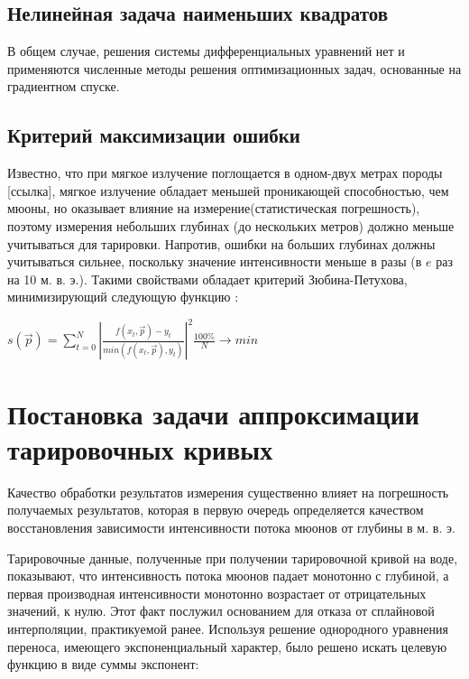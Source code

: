 \subsection{Нелинейная задача наименьших квадратов}


В общем случае, решения системы дифференциальных уравнений нет и 
применяются численные методы решения оптимизационных задач, 
основанные на градиентном спуске.

\subsection{Критерий максимизации ошибки}
Известно, что при мягкое излучение поглощается в одном-двух метрах породы [ссылка], мягкое излучение обладает
меньшей проникающей способностью, чем мюоны, но оказывает влияние на измерение(статистическая погрешность),
поэтому измерения небольших глубинах (до нескольких метров) должно меньше учитываться для тарировки. 
Напротив, ошибки на больших глубинах должны учитываться сильнее, поскольку значение интенсивности  меньше в разы
(в $e$ раз на 10 м. в. э.). Такими свойствами обладает критерий Зюбина-Петухова, минимизирующий следующую функцию : 
\begin{center}
$s(\vec{p}) = \displaystyle\sum_{t=0}^N \left|
\frac{f(x_t, \vec{p}) - y_t}{min(f(x_t, \vec{p}), y_t)}\right|^2 
\frac{100\%}{N} \rightarrow min$ %
 
\end{center}


\section{Постановка задачи аппроксимации тарировочных кривых}\label{sect2_2}

Качество обработки результатов измерения существенно влияет на погрешность
получаемых результатов, которая в первую очередь определяется
качеством восстановления зависимости интенсивности потока мюонов от глубины в м. в. э.

Тарировочные данные, полученные при получении тарировочной кривой на воде, 
показывают, что интенсивность потока мюонов падает монотонно с
глубиной, а первая производная интенсивности монотонно возрастает 
от отрицательных значений, к нулю. Этот факт послужил основанием для отказа 
от сплайновой интерполяции, практикуемой ранее. Используя решение 
однородного уравнения переноса, имеющего экспоненциальный характер, было решено
искать целевую функцию в виде суммы экспонент:

